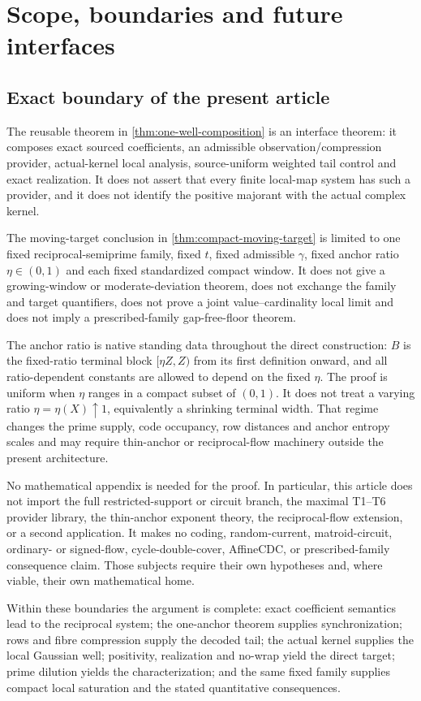 \section{Scope, boundaries and future interfaces}

\subsection{Exact boundary of the present article}

The reusable theorem in \cref{thm:one-well-composition} is an interface theorem: it composes exact sourced coefficients, an admissible observation/compression provider, actual-kernel local analysis, source-uniform weighted tail control and exact realization.  It does not assert that every finite local-map system has such a provider, and it does not identify the positive majorant with the actual complex kernel.

The moving-target conclusion in \cref{thm:compact-moving-target} is limited to one fixed reciprocal-semiprime family, fixed $t$, fixed admissible $\gamma$, fixed anchor ratio $\eta\in(0,1)$ and each fixed standardized compact window.  It does not give a growing-window or moderate-deviation theorem, does not exchange the family and target quantifiers, does not prove a joint value--cardinality local limit and does not imply a prescribed-family gap-free-floor theorem.

The anchor ratio is native standing data throughout the direct construction: $B$ is the fixed-ratio terminal block $[\eta Z,Z)$ from its first definition onward, and all ratio-dependent constants are allowed to depend on the fixed $\eta$.  The proof is uniform when $\eta$ ranges in a compact subset of $(0,1)$.  It does not treat a varying ratio $\eta=\eta(X)\uparrow1$, equivalently a shrinking terminal width.  That regime changes the prime supply, code occupancy, row distances and anchor entropy scales and may require thin-anchor or reciprocal-flow machinery outside the present architecture.

No mathematical appendix is needed for the proof.  In particular, this article does not import the full restricted-support or circuit branch, the maximal T1--T6 provider library, the thin-anchor exponent theory, the reciprocal-flow extension, or a second application.  It makes no coding, random-current, matroid-circuit, ordinary- or signed-flow, cycle-double-cover, AffineCDC, or prescribed-family consequence claim.  Those subjects require their own hypotheses and, where viable, their own mathematical home.

Within these boundaries the argument is complete: exact coefficient semantics lead to the reciprocal system; the one-anchor theorem supplies synchronization; rows and fibre compression supply the decoded tail; the actual kernel supplies the local Gaussian well; positivity, realization and no-wrap yield the direct target; prime dilution yields the characterization; and the same fixed family supplies compact local saturation and the stated quantitative consequences.
